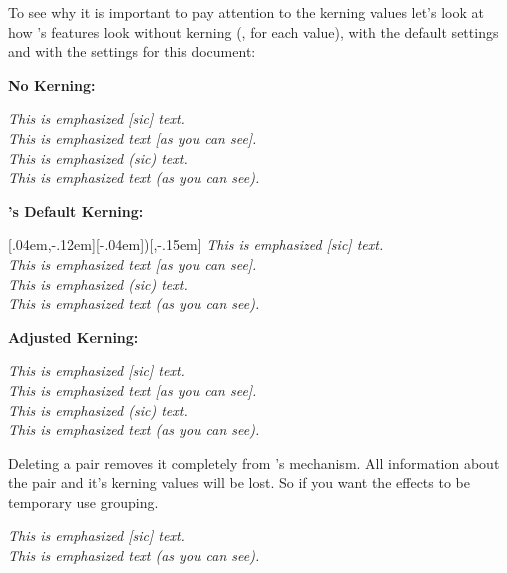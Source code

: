 \documentclass[DIV10,toc=index,toc=bib]{cnpkgdoc}
\begin{document}
To see why it is important to pay attention to the kerning values let's look at
how \embrac's features look without kerning (\ie, \code{0pt} for each value),
with the default settings and with the settings for this document:

\begin{center}
 \begin{minipage}{.5\linewidth}
  \textbf{No Kerning:}
  
  \RenewEmph{[}{]}\RenewEmph{(}{)}
  \emph{This is emphasized [sic] text.} \\
  \emph{This is emphasized text [as you can see].} \\
  \emph{This is emphasized (sic) text.} \\
  \emph{This is emphasized text (as you can see).}
 \end{minipage}\bigskip
 
 \begin{minipage}{.5\linewidth}
  \textbf{\embrac's Default Kerning:}
  
  \RenewEmph{[}{]}[.04em,-.12em]\RenewEmph{(}[-.04em]{)}[,-.15em]
  \emph{This is emphasized [sic] text.} \\
  \emph{This is emphasized text [as you can see].} \\
  \emph{This is emphasized (sic) text.} \\
  \emph{This is emphasized text (as you can see).}
 \end{minipage}\bigskip
 
 \begin{minipage}{.5\linewidth}
  \textbf{Adjusted Kerning:}
  
  \emph{This is emphasized [sic] text.} \\
  \emph{This is emphasized text [as you can see].} \\
  \emph{This is emphasized (sic) text.} \\
  \emph{This is emphasized text (as you can see).}
 \end{minipage}
\end{center}

Deleting a pair removes it completely from \embrac's mechanism. All information
about the pair and it's kerning values will be lost. So if you want the effects
to be temporary use grouping.
\begin{beispiel}
 \DeleteEmph[]
 \emph{This is emphasized [sic] text.} \\
 \emph{This is emphasized text (as you can see).}
\end{beispiel}
\end{document}
